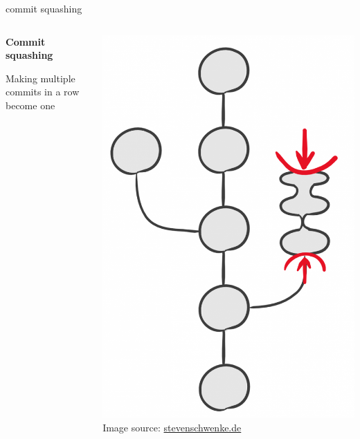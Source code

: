 \documentclass{beamer}
\begin{document}
\begin{frame}{commit squashing}
    \begin{columns}
        \begin{column}{0.5\textwidth}
            \textbf{Commit squashing}

            Making multiple commits in a row become one
        \end{column}
        \begin{column}{0.5\textwidth}
            \includegraphics[height=0.5\textheight]{graphics/commit-squashing.png}
            {\small Image source: \href{https://stevenschwenke.de/GitToSquashOrNotToSquash}{stevenschwenke.de}}
        \end{column}
    \end{columns}
\end{frame}
\end{document}

